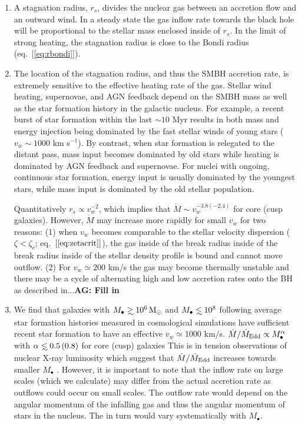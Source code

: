 \documentclass[usenatbib,fleqn]{mn2e}
\newcommand{\Mdot}{\dot{M}}
\newcommand{\eddr}{\dot{M}/\dot{M}_{\rm Edd}}
\newcommand\lsim{\mathrel{\rlap{\lower4pt\hbox{\hskip1pt$\sim$}}
    \raise1pt\hbox{$<$}}}
\newcommand\gsim{\mathrel{\rlap{\lower4pt\hbox{\hskip1pt$\sim$}}
    \raise1pt\hbox{$>$}}}
\newcommand{\rs}{r_s}
\newcommand{\Mbh}[1][]{M_{\bullet#1}}
\begin{document}
  \begin{enumerate}
  \item A stagnation radius, $\rs$, divides the nuclear gas between an accretion flow and an
    outward wind. In a steady state the gas inflow rate towards the black hole will be proportional to the
    stellar mass enclosed inside of $\rs$.  In the limit of strong heating, the stagnation radius is close to the Bondi radius (eq.~[\ref{eq:rbondi}]).  
  \item The location of the stagnation radius, and thus the SMBH accretion rate, is extremely sensitive to the effective heating rate of the gas.  Stellar wind heating, supernovae, and AGN feedback depend on the SMBH mass as well as the star
    formation history in the galactic nucleus.  For example, a recent burst of star formation within the last $\sim 10$ Myr results in both mass and energy injection being dominated by the fast stellar winds of young stars ($v_w \sim 1000$ km s$^{-1}$). By contrast, when star formation is relegated to the distant pass, mass input becomes dominated by old stars while heating is dominated by AGN feedback and supernovae.  For nuclei with ongoing, continuous star formation, energy input is usually dominated by the youngest stars, while mass input is dominated by the old stellar population.  
  
    Quantitatively $\rs\propto v_w^{-2}$, which implies that $\Mdot\sim
    v_w^{-3.8 (-2.4)}$ for core (cusp galaxies).   However, $\Mdot$ may increase more rapidly for small $v_w$ for two reasons: (1) when $v_w$ becomes comparable to the stellar velocity dispersion ($\zeta < \zeta_c$; eq.~$[\ref{eq:zetacrit}]$), the
    gas inside of the break radius inside of the break radius inside
    of the stellar density profile is bound and cannot move
    outflow. (2) For $v_w\simeq200 $ km/s the gas may become thermally
    unstable and there may be a cycle of alternating high and low
    accretion rates onto the BH as described in...{\bf AG: Fill in} 

  \item We find that galaxies with $\Mbh\gsim 10^6 \Msun$ and
    $\Mbh\lsim 10^8$ following average star formation histories
    measured in cosmological simulations \citep{MosterNaab+:2013a}
    have sufficient recent star formation to have an effective
    $v_w\simeq 1000$ km/s. $\eddr \propto \Mbh^{\alpha}$ with
    $\alpha\lsim 0.5 \, (0.8)$ for core (cusp) galaxies This is in
    tension observations of nuclear X-ray luminosity which suggest
    that $\eddr$ increases towards smaller $\Mbh$
    \citep{Miller+15}. However, it is important to note that the
    inflow rate on large scales (which we calculate) may differ from
    the actual accretion rate as outflows could occur on small
    scales. The outflow rate would depend on the angular momentum of
    the infalling gas and thus the angular momentum of stars in the
    nucleus. The in turn would vary systematically with $\Mbh$.


\end{enumerate}
\end{document}
